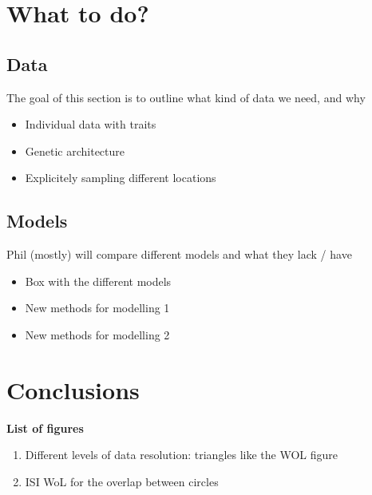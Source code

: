 \documentclass[11pt,oneside]{article}
\begin{document}
\section{What to do?}

\subsection{Data}

The goal of this section is to outline what kind of data we need, and why

\begin{itemize}
	\item Individual data with traits
	\item Genetic architecture
	\item Explicitely sampling different locations
\end{itemize}

\subsection{Models}

Phil (mostly) will compare different models and what they lack / have 

\begin{itemize}
	\item Box with the different models
	\item New methods for modelling 1
	\item New methods for modelling 2
\end{itemize}

\section{Conclusions}



\printbibliography

\cleardoublepage

\textbf{List of figures}
\begin{enumerate}
	\item Different levels of data resolution: triangles like the WOL figure
	\item ISI WoL for the overlap between circles
\end{enumerate}
\end{document}
